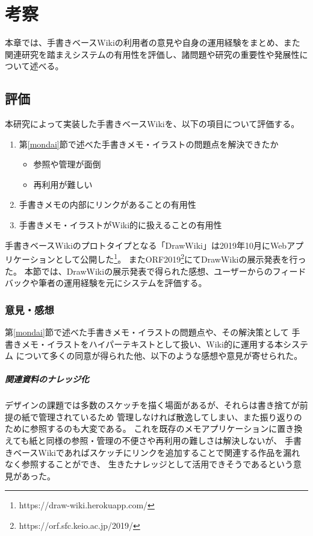 \chapter{考察}
\label{chap:kosatsu}

本章では、手書きベースWikiの利用者の意見や自身の運用経験をまとめ、また関連研究を踏まえシステムの有用性を評価し、諸問題や研究の重要性や発展性について述べる。

\newpage

\section{評価}
本研究によって実装した手書きベースWikiを、以下の項目について評価する。

\begin{enumerate}
    \item 第\ref{mondai}節で述べた手書きメモ・イラストの問題点を解決できたか
    \begin{itemize}
              \item 参照や管理が面倒
              \item 再利用が難しい
    \end{itemize}
    \item 手書きメモの内部にリンクがあることの有用性
    \item 手書きメモ・イラストがWiki的に扱えることの有用性
\end{enumerate}


手書きベースWikiのプロトタイプとなる「DrawWiki」は2019年10月にWebアプリケーションとして公開した\footnote{ \textsf{https://draw-wiki.herokuapp.com/} }。
またORF2019\footnote{ \textsf{https://orf.sfc.keio.ac.jp/2019/} }にてDrawWikiの展示発表を行った。
本節では、DrawWikiの展示発表で得られた感想、ユーザーからのフィードバックや筆者の運用経験を元にシステムを評価する。

\subsection{意見・感想}

第\ref{mondai}節で述べた手書きメモ・イラストの問題点や、その解決策として
手書きメモ・イラストをハイパーテキストとして扱い、Wiki的に運用する本システム
について多くの同意が得られた他、以下のような感想や意見が寄せられた。

\paragraph*{関連資料のナレッジ化}
デザインの課題では多数のスケッチを描く場面があるが、それらは書き捨てが前提の紙で管理されているため
管理しなければ散逸してしまい、また振り返りのために参照するのも大変である。
これを既存のメモアプリケーションに置き換えても紙と同様の参照・管理の不便さや再利用の難しさは解決しないが、
手書きベースWikiであればスケッチにリンクを追加することで関連する作品を漏れなく参照することができ、
生きたナレッジとして活用できそうであるという意見があった。

